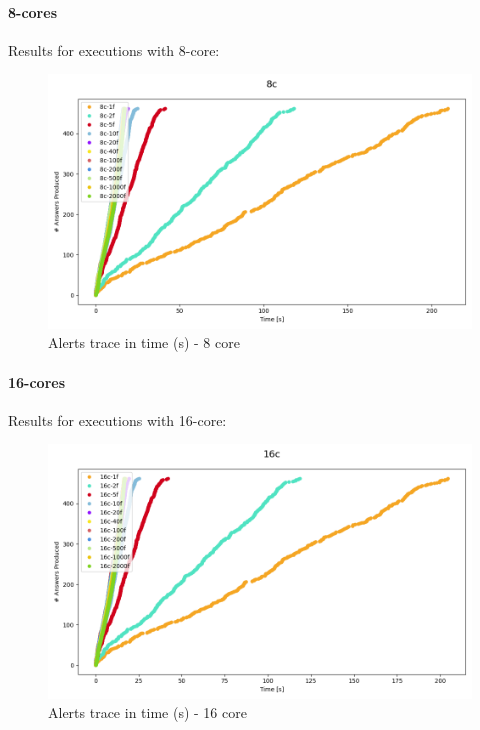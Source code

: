 \paragraph{8-cores\\}

Results for executions with 8-core:

\begin{figure}[H]
  \centering
  \includegraphics[scale = 0.5]{images/4-Experiments/E2/fixedcores/8c/traces.png}
  \caption{Alerts trace in time (s) - 8 core}
\end{figure}

\paragraph{16-cores\\}

Results for executions with 16-core:

\begin{figure}[H]
  \centering
  \includegraphics[scale = 0.5]{images/4-Experiments/E2/fixedcores/16c/traces.png}
  \caption{Alerts trace in time (s) - 16 core}
\end{figure}

